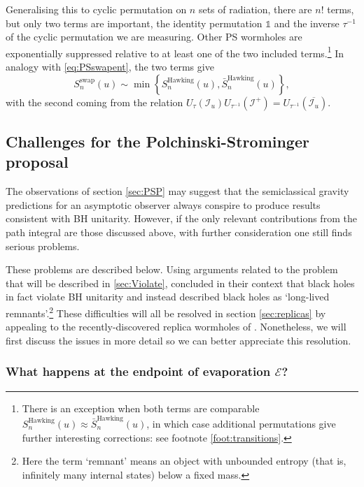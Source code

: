 \documentclass[letterpaper,12pt]{article}
\newcommand*{\id}{\mathds{1}}
\newcommand*{\scri}{\mathscr{I}} %
\newcommand*{\evap}{\mathscr{E}} %
\begin{document}
Generalising this to cyclic permutation on $n$ sets of radiation, there are $n!$ terms, but only two terms are important, the identity permutation $\id$ and the inverse $\tau^{-1}$ of the cyclic permutation we are measuring. Other PS wormholes are exponentially suppressed relative to at least one of the two included terms.\footnote{There is an exception when both terms are comparable $S_n^\text{Hawking}(u)\approx \bar{S}_n^\text{Hawking}(u)$, in which case additional permutations give further interesting corrections: see footnote \ref{foot:transitions}.} In analogy with \eqref{eq:PSswapent}, the two terms give
\begin{equation}
	S^\text{swap}_n(u) \sim \min \left\{ S_n^\text{Hawking}(u),\bar{S}_n^\text{Hawking}(u) \right\},\label{eq:PSswapent2}
\end{equation}
with the second coming from the relation $U_{\tau}(\scri_u) U_{\tau^{-1}}(\scri^+) = U_{\tau^{-1}}(\overline{\scri_u})$.


\subsection{Challenges for the Polchinski-Strominger proposal}
\label{sec:PSchallenges}

The observations of section \ref{sec:PSP} may suggest that the semiclassical gravity predictions for an asymptotic observer always conspire to produce results consistent with BH unitarity.  However, if the only relevant contributions from the path integral are those discussed above, with further consideration one still finds serious problems.

These problems are described below.
Using arguments related to the problem that will be described in \ref{sec:Violate}, \cite{Polchinski:1994zs} concluded in their context that black holes in fact violate BH unitarity and instead described black holes as `long-lived remnants'.\footnote{Here the term `remnant' means an object with unbounded entropy (that is, infinitely many internal states) below a fixed mass.}
These difficulties will all be resolved in section \ref{sec:replicas} by appealing to the recently-discovered replica wormholes of \cite{Almheiri:2019qdq,Penington:2019kki}. Nonetheless, we will first discuss the issues in more detail so we can better appreciate this resolution.



\subsubsection{What happens at the endpoint of evaporation $\evap$?}\label{sec:endpoint}
\end{document}
